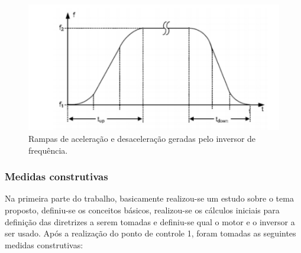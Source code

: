 \begin{figure}[h!]
	\centering
		\includegraphics[keepaspectratio=true,scale=0.9]{figuras/4.png}
	\caption{Rampas de aceleração e desaceleração geradas pelo inversor de frequência. \cite{siemens}}
    \label{rampas}
\end{figure}

\subsubsection*{Medidas construtivas}

Na primeira parte do trabalho, basicamente realizou-se um estudo sobre o tema proposto, definiu-se os conceitos básicos, realizou-se os cálculos iniciais para definição das diretrizes a serem tomadas e definiu-se qual o motor e o inversor a ser usado. Após a realização do ponto de controle 1, foram tomadas as seguintes medidas construtivas:

